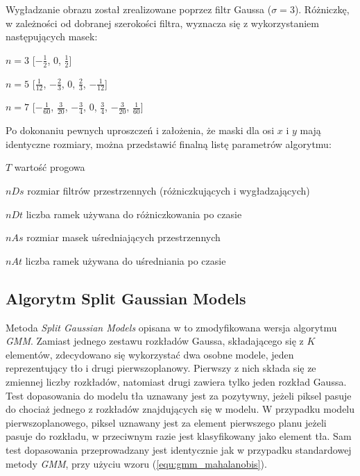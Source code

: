 Wygładzanie obrazu został zrealizowane poprzez filtr Gaussa ($\sigma = 3$). Różniczkę, w zależności od dobranej szerokości filtra, wyznacza się z wykorzystaniem następujących masek:
\begin{eqwhere}[2cm]
	\item[$n=3$] [$-\frac{1}{2}$, $0$, $\frac{1}{2}$]
	\item[$n=5$] [$\frac{1}{12}$, $-\frac{2}{3}$, $0$, $\frac{2}{3}$, $-\frac{1}{12}$]
	\item[$n=7$] [$-\frac{1}{60}$, $\frac{3}{20}$, $-\frac{3}{4}$, $0$, $\frac{3}{4}$, $-\frac{3}{20}$, $\frac{1}{60}$]\\
\end{eqwhere}

Po dokonaniu pewnych uproszczeń i założenia, że maski dla osi $x$ i $y$ mają identyczne rozmiary, można przedstawić finalną listę parametrów algorytmu:
\begin{eqwhere}[2cm]
	\item[$T$]	 wartość progowa
	\item[$nDs$]  rozmiar filtrów przestrzennych (różniczkujących i wygładzających)
	\item[$nDt$]  liczba ramek używana do różniczkowania po czasie
	\item[$nAs$]  rozmiar masek uśredniających przestrzennych
	\item[$nAt$]  liczba ramek używana do uśredniania po czasie\\
\end{eqwhere}

\subsection{Algorytm Split Gaussian Models}
\label{subsec:split_gaussian_opis}

Metoda \textit{Split Gaussian Models} opisana w \cite{janus_15} to zmodyfikowana wersja algorytmu \textit{GMM}. Zamiast jednego zestawu rozkładów Gaussa, składającego się z $K$ elementów, zdecydowano się wykorzystać dwa osobne modele, jeden reprezentujący tło i drugi pierwszoplanowy. Pierwszy z nich składa się ze zmiennej liczby rozkładów, natomiast drugi zawiera tylko jeden rozkład Gaussa. Test dopasowania do modelu tła uznawany jest za pozytywny, jeżeli piksel pasuje do chociaż jednego z rozkładów znajdujących się w modelu. W przypadku modelu pierwszoplanowego, piksel uznawany jest za element pierwszego planu jeżeli pasuje do rozkładu, w przeciwnym razie jest klasyfikowany jako element tła. Sam test dopasowania przeprowadzany jest identycznie jak w przypadku standardowej metody \textit{GMM}, przy użyciu wzoru (\ref{equ:gmm_mahalanobis}).

